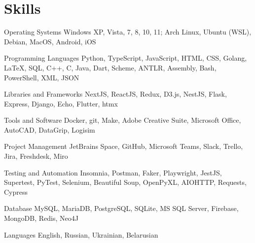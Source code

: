 \section{Skills}

\cvitem
    {Operating Systems}
    {%
        Windows XP, Vista, 7, 8, 10, 11; Arch Linux, Ubuntu (WSL), Debian,
        MacOS, Android, iOS%
    }

\cvitem
    {Programming Languages}
    {%
        Python, TypeScript, JavaScript, HTML, CSS, Golang, \LaTeX, SQL,
        C++, C, Java, Dart, Scheme, ANTLR, Assembly, Bash, PowerShell, XML,
        JSON%
    }

\cvitem
    {Libraries and Frameworks}
    {%
        NextJS, ReactJS, Redux, D3.js, NestJS, Flask, Express, Django,
        Echo, Flutter, htmx%
    }

\cvitem
    {Tools and Software}
    {%
        Docker, git, Make, Adobe Creative Suite, Microsoft Office, AutoCAD,
        DataGrip, Logisim%
    }

\cvitem
    {Project Management}
    {%
        JetBrains Space, GitHub, Microsoft Teams, Slack, Trello, Jira,
        Freshdesk, Miro%
    }

\cvitem
    {Testing and Automation}
    {%
        Insomnia, Postman, Faker, Playwright, JestJS, Supertest, PyTest,
        Selenium, Beautiful Soup, OpenPyXL, AIOHTTP, Requests, Cypress%
    }

\cvitem
    {Database}
    {%
        MySQL, MariaDB, PostgreSQL, SQLite, MS SQL Server, Firebase,
        MongoDB, Redis, Neo4J%
    }

\cvitem
    {Languages}
    {English, Russian, Ukrainian, Belarusian}